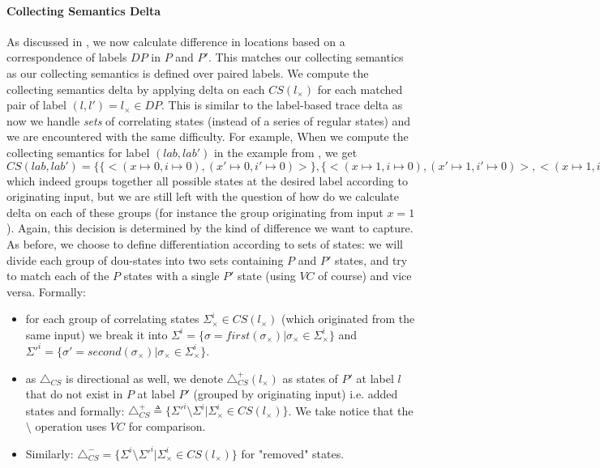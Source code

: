 \paragraph{Collecting Semantics Delta} 
As discussed in , we now calculate difference in locations based on a correspondence of labels $DP$ in $P$ and $P'$. This matches our collecting semantics as our collecting semantics is defined over paired labels. We compute the collecting semantics delta by applying delta on each $CS(l_{\times})$ for each matched pair of label $(l,l') = l_{\times} \in DP$. This is similar to the label-based trace delta as now we handle \emph{sets} of correlating states (instead of a series of regular states) and we are encountered with the same difficulty. For example, When we compute the collecting semantics for label $(lab,lab')$ in the example from , we get $CS(lab,lab') = \{ \{ <(x \mapsto 0,i \mapsto 0),(x' \mapsto 0,i' \mapsto 0)> \}, \{ <(x \mapsto 1,i \mapsto 0),(x' \mapsto 1,i' \mapsto 0)>, <(x \mapsto 1,i \mapsto 1),(x' \mapsto 1,i' \mapsto 0)>, <(x \mapsto 1,i \mapsto 0),(x' \mapsto 1,i' \mapsto 1)>, <(x \mapsto 1,i \mapsto 1),(x' \mapsto 1,i' \mapsto 1)>, <(x \mapsto 1,i= \mapsto 0),(x' \mapsto 1,i' \mapsto 2)>, <(x \mapsto 1,i \mapsto 1),(x' \mapsto 1,i' \mapsto 2)> \}, ... \}$ which indeed groups together all possible states at the desired label according to originating input, but we are still left with the question of how do we calculate delta on each of these groups (for instance the group originating from input $x=1$). Again, this decision is determined by the kind of difference we want to capture. As before, we choose to define differentiation according to sets of states: we will divide each group of dou-states into two sets containing $P$ and $P'$ states, and try to match each of the $P$ states with a single $P'$ state (using $VC$ of course) and vice versa. Formally:
\begin{itemize}
\item for each group of correlating states $\Sigma_{\times}^{i} \in CS(l_{\times})$ (which originated from the same input) we break it into  $\Sigma^{i} = \{\sigma = first(\sigma_{\times}) |  \sigma_{\times} \in \Sigma_{\times}^{i}\}$ and $\Sigma'^{i} = \{\sigma' = second(\sigma_{\times}) |  \sigma_{\times} \in \Sigma_{\times}^{i}\}$.
\item as $\triangle_{CS}$ is directional as well, we denote $\triangle_{CS}^{+}(l_{\times})$ as states of $P'$ at label $l$ that do not exist in $P$ at label $P'$ (grouped by originating input) i.e. added states and formally: $\triangle_{CS}^{+} \triangleq \{ \Sigma'^{i} \setminus \Sigma^{i} | \Sigma_{\times}^{i} \in CS(l_{\times}) \}$. We take notice that the $\setminus$ operation uses $VC$ for comparison.
\item Similarly: $\triangle_{CS}^{-} = \{ \Sigma^{i} \setminus \Sigma'^{i} | \Sigma_{\times}^{i} \in CS(l_{\times}) \}$ for "removed" states.
\end{itemize}


